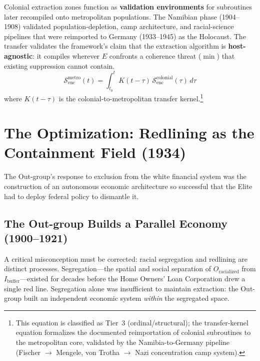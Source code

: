 \begin{keyinsight}
Colonial extraction zones function as \textbf{validation environments} for subroutines later recompiled onto metropolitan populations. The Namibian phase (1904--1908) validated population-depletion, camp architecture, and racial-science pipelines that were reimported to Germany (1933--1945) as the Holocaust. The transfer validates the framework's claim that the extraction algorithm is \textbf{host-agnostic}: it compiles wherever $E$ confronts a coherence threat ($\min$) that existing suppression cannot contain.
\begin{equation}\label{eq:9.colonial-lab}
\mathcal{S}_{\text{enc}}^{\text{metro}}(t) = \int_{t_0}^{t} K(t - \tau) \, \mathcal{S}_{\text{enc}}^{\text{colonial}}(\tau) \, d\tau
\end{equation}
where $K(t-\tau)$ is the colonial-to-metropolitan transfer kernel.\footnote{This equation is classified as Tier~3 (ordinal/structural); the transfer-kernel equation formalizes the documented reimportation of colonial subroutines to the metropolitan core, validated by the Namibia-to-Germany pipeline (Fischer $\to$ Mengele, von Trotha $\to$ Nazi concentration camp system).}
\end{keyinsight}

\section{The Optimization: Redlining as the Containment Field (1934)}

The Out-group's response to exclusion from the white financial system was the construction of an autonomous economic architecture so successful that the Elite had to deploy federal policy to dismantle it.

\subsection{The Out-group Builds a Parallel Economy (1900--1921)}

A critical misconception must be corrected: racial segregation and redlining are distinct processes. Segregation---the spatial and social separation of $O_{\text{racialized}}$ from $I_{\text{buffer}}$---existed for decades before the Home Owners' Loan Corporation drew a single red line. Segregation alone was insufficient to maintain extraction: the Out-group built an independent economic system \textit{within} the segregated space.

